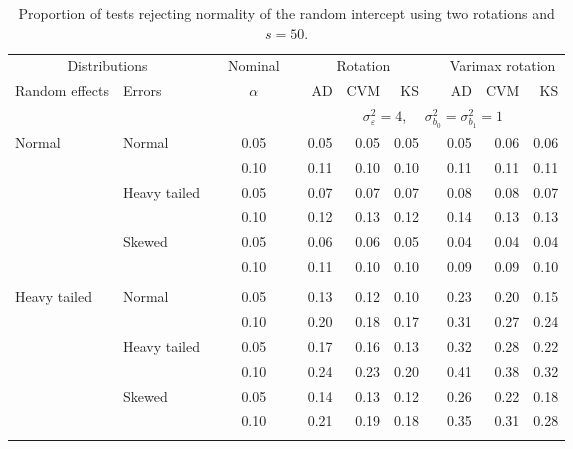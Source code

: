 \begin{table}[ht]
\centering
\caption{\label{tab:simb050} Proportion of tests rejecting normality of the random intercept using two rotations and $s = 50$.}
\begin{scriptsize}
\begin{tabular}{ll p{.1cm} c p{.1cm} rrr p{.1cm} rrr}
  \hline
  \multicolumn{2}{c}{Distributions}& & Nominal & &  \multicolumn{3}{c}{Rotation} & & \multicolumn{3}{c}{Varimax rotation} \\ \cline{1-2} \cline{6-8} \cline{10-12}   
  Random effects & Errors & & $\alpha$ & & AD & CVM & KS & & AD & CVM & KS \\ 
   \hline
& && && \multicolumn{7}{c}{$\sigma_{\varepsilon}^2 = 4$, \ \ $\sigma_{b_0}^2 = \sigma_{b_1}^2 = 1$} \\ \cline{6-12}
\rowcolor{gray!20}Normal       & Normal       && 0.05 &&   0.05 & 0.05 & 0.05 && 0.05 & 0.06 & 0.06 \\ 
\rowcolor{gray!20}             &              && 0.10 &&   0.11 & 0.10 & 0.10 && 0.11 & 0.11 & 0.11 \\ 
\rowcolor{gray!20}             & Heavy tailed && 0.05 &&   0.07 & 0.07 & 0.07 && 0.08 & 0.08 & 0.07 \\ 
\rowcolor{gray!20}             &              && 0.10 &&   0.12 & 0.13 & 0.12 && 0.14 & 0.13 & 0.13 \\ 
\rowcolor{gray!20}             & Skewed       && 0.05 &&   0.06 & 0.06 & 0.05 && 0.04 & 0.04 & 0.04 \\ 
\rowcolor{gray!20}             &              && 0.10 &&   0.11 & 0.10 & 0.10 && 0.09 & 0.09 & 0.10 \\ 
             &&&&&&&&&&&\\
Heavy tailed & Normal       && 0.05 &&   0.13 & 0.12 & 0.10 && 0.23 & 0.20 & 0.15 \\ 
             &              && 0.10 &&   0.20 & 0.18 & 0.17 && 0.31 & 0.27 & 0.24 \\ 
             & Heavy tailed && 0.05 &&   0.17 & 0.16 & 0.13 && 0.32 & 0.28 & 0.22 \\ 
             &              && 0.10 &&   0.24 & 0.23 & 0.20 && 0.41 & 0.38 & 0.32 \\ 
             & Skewed       && 0.05 &&   0.14 & 0.13 & 0.12 && 0.26 & 0.22 & 0.18 \\ 
             &              && 0.10 &&   0.21 & 0.19 & 0.18 && 0.35 & 0.31 & 0.28 \\ 
             &&&&&&&&&&&\\

\end{tabular}
\end{scriptsize}
\end{table}
